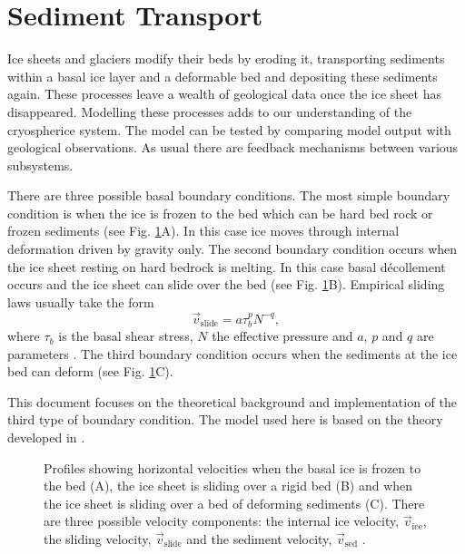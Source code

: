 \section{Sediment Transport}
Ice sheets and glaciers modify their beds by eroding it, transporting sediments within a basal ice layer and a deformable bed and depositing these sediments again. These processes leave a wealth of geological data once the ice sheet has disappeared. Modelling these processes adds to our understanding of the cryospherice system. The model can be tested by comparing model output with geological observations. As usual there are feedback mechanisms between various subsystems.

There are three possible basal boundary conditions. The most simple boundary condition is when the ice is frozen to the bed which can be hard bed rock or frozen sediments (see Fig. \ref{erosion.fig.velos}A). In this case ice moves through internal deformation driven by gravity only.  The second boundary condition occurs when the ice sheet resting on hard bedrock is melting. In this case basal d\'ecollement occurs and the ice sheet can slide over the bed (see Fig. \ref{erosion.fig.velos}B). Empirical sliding laws usually take the form
\begin{equation}
  \vec{v}_{\text{slide}} = a\tau_b^pN^{-q},
\end{equation}
where $\tau_b$ is the basal shear stress, $N$ the effective pressure and $a$, $p$ and $q$ are parameters \citep{glac.1}. The third boundary condition occurs when the sediments at the ice bed can deform (see Fig. \ref{erosion.fig.velos}C).

This document focuses on the theoretical background and implementation of the third type of boundary condition. The model used here is based on the theory developed in \citet{erosion.5}. 

\begin{figure}[htbp]
  \centering
   
  \caption{Profiles showing horizontal velocities when the basal ice is frozen to the bed (A), the ice sheet is sliding over a rigid bed (B) and when the ice sheet is sliding over a bed of deforming sediments (C). There are three possible velocity components: the internal ice velocity, $\vec{v}_{\text{ice}}$, the sliding velocity, $\vec{v}_{\text{slide}}$ and the sediment velocity, $\vec{v}_{\text{sed}}$ \citep[after][]{erosion.5}.}
  \label{erosion.fig.velos}
\end{figure}


